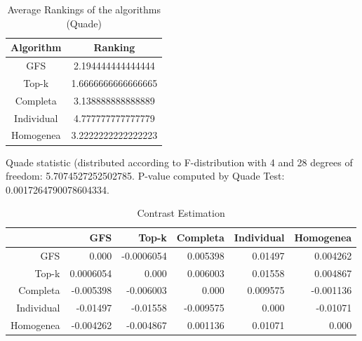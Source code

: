 \documentclass[a4paper,10pt]{article}
\begin{document}
\begin{landscape}
\newpage

\begin{table}[!htp]
\centering
\caption{Average Rankings of the algorithms (Quade)
}\begin{tabular}{c|c}
Algorithm&Ranking\\
\hline
GFS&2.194444444444444\\
Top-k&1.6666666666666665\\
Completa&3.138888888888889\\
Individual&4.777777777777779\\
Homogenea&3.2222222222222223\\
\end{tabular}
\end{table}
Quade statistic (distributed according to F-distribution with 4 and 28 degrees of freedom: 5.7074527252502785. 
P-value computed by Quade Test: 0.0017264790078604334.\newline


\newpage

\begin{table}[!htp]
\centering\tiny
\caption{Contrast Estimation}
\begin{tabular}{
|r|r|r|r|r|r|}
\hline
 &GFS&Top-k&Completa&Individual&Homogenea\\
\hline
GFS&0.000&-0.0006054&0.005398&0.01497&0.004262\\
\hline
Top-k&0.0006054&0.000&0.006003&0.01558&0.004867\\
\hline
Completa&-0.005398&-0.006003&0.000&0.009575&-0.001136\\
\hline
Individual&-0.01497&-0.01558&-0.009575&0.000&-0.01071\\
\hline
Homogenea&-0.004262&-0.004867&0.001136&0.01071&0.000\\
\hline

\end{tabular}
\end{table}

\newpage


\end{landscape}
\end{document}
